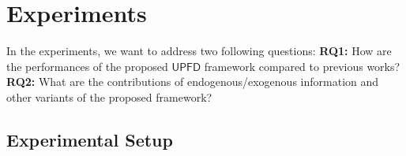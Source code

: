 \documentclass[sigconf]{acmart}
\newcommand\UPFD{$\mathsf{UPFD}$\xspace}
\begin{document}
 \begin{table}[t]
\small
\centering
\caption{Dataset and graph statistics.}
\label{tab:stat}
\end{table}

\section{Experiments}
\label{sec03:exp}

In the experiments, we want to address two following questions: 
\textbf{RQ1:} How are the performances of the proposed \UPFD framework compared to previous works?
\textbf{RQ2:} What are the contributions of endogenous/exogenous information and other variants of the proposed framework?

\subsection{Experimental Setup}
\end{document}
